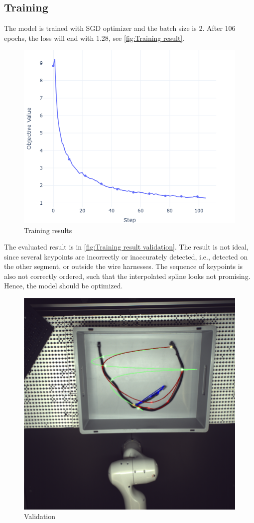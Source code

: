 	\subsection{Training} 
	The model is trained with SGD optimizer and the batch size is 2. After 106 epochs, the loss will end with 1.28, see \autoref{fig:Training result}.\\
	\begin{figure}
		\centering
		\includegraphics[width=0.6\linewidth]{example_images/noAttn_keypoints_100}
		\caption{Training results}
		\label{fig:Training result}
	\end{figure}
	The evaluated result is in \autoref{fig:Training result validation}. The result is not ideal, since several keypoints are incorrectly or
	inaccurately detected, i.e., detected on the other segment, or outside the wire harnesses. The sequence of keypoints is also not correctly 
	ordered, such that the interpolated spline looks not promising. Hence, the model should be optimized.
	\begin{figure}
		\centering
		\includegraphics[width=0.6\linewidth]{example_images/noAttn_keypoints_100_eval}
		\caption{Validation}
		\label{fig:Training result validation}
	\end{figure}
